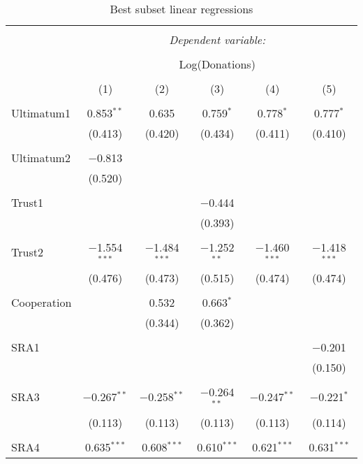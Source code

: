 \begin{table}[H] \centering 
  \caption{Best subset linear regressions} 
  \label{} 
     \begin{adjustbox}{width=\textwidth, totalheight=\baselineskip}
  \begin{tabular}{@{\extracolsep{5pt}}lccccc} 
\\[-1.8ex]\hline 
\hline \\[-1.8ex] 
 & \multicolumn{5}{c}{\textit{Dependent variable:}} \\ 
\cline{2-6} 
\\[-1.8ex] & \multicolumn{5}{c}{Log(Donations)} \\ 
\\[-1.8ex] & (1) & (2) & (3) & (4) & (5)\\ 
\hline \\[-1.8ex] 
 Ultimatum1 & 0.853$^{**}$ & 0.635 & 0.759$^{*}$ & 0.778$^{*}$ & 0.777$^{*}$ \\ 
  & (0.413) & (0.420) & (0.434) & (0.411) & (0.410) \\ 
  & & & & & \\ 
 Ultimatum2 & $-$0.813 &  &  &  &  \\ 
  & (0.520) &  &  &  &  \\ 
  & & & & & \\ 
 Trust1 &  &  & $-$0.444 &  &  \\ 
  &  &  & (0.393) &  &  \\ 
  & & & & & \\ 
 Trust2 & $-$1.554$^{***}$ & $-$1.484$^{***}$ & $-$1.252$^{**}$ & $-$1.460$^{***}$ & $-$1.418$^{***}$ \\ 
  & (0.476) & (0.473) & (0.515) & (0.474) & (0.474) \\ 
  & & & & & \\ 
 Cooperation &  & 0.532 & 0.663$^{*}$ &  &  \\ 
  &  & (0.344) & (0.362) &  &  \\ 
  & & & & & \\ 
 SRA1 &  &  &  &  & $-$0.201 \\ 
  &  &  &  &  & (0.150) \\ 
  & & & & & \\ 
 SRA3 & $-$0.267$^{**}$ & $-$0.258$^{**}$ & $-$0.264$^{**}$ & $-$0.247$^{**}$ & $-$0.221$^{*}$ \\ 
  & (0.113) & (0.113) & (0.113) & (0.113) & (0.114) \\ 
  & & & & & \\ 
 SRA4 & 0.635$^{***}$ & 0.608$^{***}$ & 0.610$^{***}$ & 0.621$^{***}$ & 0.631$^{***}$ \\ 

\end{tabular}
\end{adjustbox}
\end{table}

